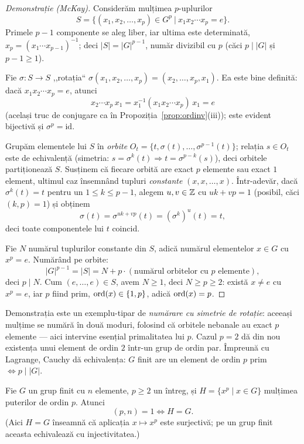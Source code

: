 \begin{proof}[Demonstrație (McKay)]
Considerăm mulțimea $p$-uplurilor
\[
S=\bigl\{(x_1,x_2,\dots,x_p)\in G^p\ \big|\ x_1x_2\cdots x_p=e\bigr\}.
\]
Primele $p-1$ componente se aleg liber, iar ultima este determinată, $x_p=(x_1\cdots x_{p-1})^{-1}$; deci $|S|=|G|^{p-1}$, număr divizibil cu $p$ (căci $p\mid|G|$ și $p-1\ge1$).

Fie $\sigma:S\to S$ ,,rotația`` $\sigma(x_1,x_2,\dots,x_p)=(x_2,\dots,x_p,x_1)$. Ea este bine definită: dacă $x_1x_2\cdots x_p=e$, atunci
\[
x_2\cdots x_p\,x_1=x_1^{-1}(x_1x_2\cdots x_p)\,x_1=e
\]
(același truc de conjugare ca în Propoziția~\ref{prop:ordinv}(iii)); este evident bijectivă și $\sigma^p=\mathrm{id}$.

Grupăm elementele lui $S$ în \emph{orbite} $O_t=\{t,\sigma(t),\dots,\sigma^{p-1}(t)\}$; relația $s\in O_t$ este de echivalență (simetria: $s=\sigma^k(t)\Rightarrow t=\sigma^{p-k}(s)$), deci orbitele partiționează $S$. Susținem că fiecare orbită are exact $p$ elemente sau exact $1$ element, ultimul caz însemnând tupluri \emph{constante} $(x,x,\dots,x)$. Într-adevăr, dacă $\sigma^k(t)=t$ pentru un $1\le k\le p-1$, alegem $u,v\in\mathbb{Z}$ cu $uk+vp=1$ (posibil, căci $(k,p)=1$) și obținem
\[
\sigma(t)=\sigma^{uk+vp}(t)=(\sigma^k)^u(t)=t,
\]
deci toate componentele lui $t$ coincid.

Fie $N$ numărul tuplurilor constante din $S$, adică numărul elementelor $x\in G$ cu $x^p=e$. Numărând pe orbite:
\[
|G|^{p-1}=|S|=N+p\cdot(\text{numărul orbitelor cu }p\text{ elemente}),
\]
deci $p\mid N$. Cum $(e,\dots,e)\in S$, avem $N\ge1$, deci $N\ge p\ge2$: există $x\neq e$ cu $x^p=e$, iar $p$ fiind prim, $\operatorname{ord}(x)\in\{1,p\}$, adică $\operatorname{ord}(x)=p$.
\end{proof}

\begin{observatie}
Demonstrația este un exemplu-tipar de \emph{numărare cu simetrie de rotație}: aceeași mulțime se numără în două moduri, folosind că orbitele nebanale au exact $p$ elemente --- aici intervine esențial primalitatea lui $p$. Cazul $p=2$ dă din nou existența unui element de ordin $2$ într-un grup de ordin par. Împreună cu Lagrange, Cauchy dă echivalența: $G$ finit are un element de ordin $p$ prim $\iff p\mid|G|$.
\end{observatie}

\begin{corolar}\label{lema:puterep}
Fie $G$ un grup finit cu $n$ elemente, $p\ge 2$ un întreg, și $H=\{x^p\mid x\in G\}$ mulțimea puterilor de ordin $p$. Atunci
\[
(p,n)=1 \iff H=G.
\]
(Aici $H=G$ înseamnă că aplicația $x\mapsto x^p$ este surjectivă; pe un grup finit aceasta echivalează cu injectivitatea.)
\end{corolar}

